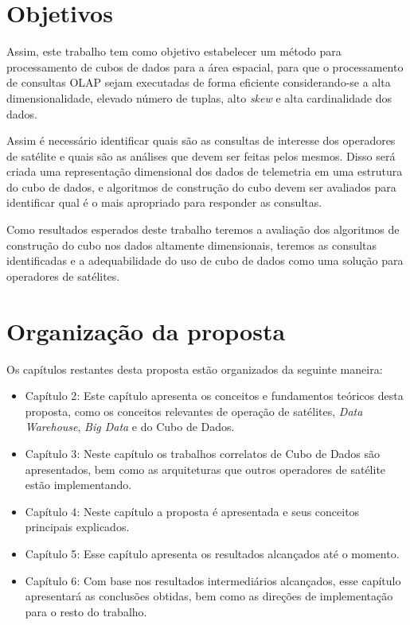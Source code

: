 \section{Objetivos}\label{ch:intro:obj}

{\color{cerulean}

Assim, este trabalho tem como objetivo estabelecer um método para processamento de cubos de dados para a área espacial, para que o processamento de consultas OLAP sejam executadas de forma eficiente considerando-se a alta dimensionalidade, elevado número de tuplas, alto \textit{skew} e alta cardinalidade dos dados.

Assim é necessário identificar quais são as consultas de interesse dos operadores de satélite e quais são as análises que devem ser feitas pelos mesmos.
Disso será criada uma representação dimensional dos dados de telemetria em uma estrutura do cubo de dados, e  algoritmos de construção do cubo devem ser avaliados para identificar qual é o mais apropriado para responder as consultas.

Como resultados esperados deste trabalho teremos a avaliação dos algoritmos de construção do cubo nos dados altamente dimensionais, teremos as consultas identificadas e a adequabilidade do uso de cubo de dados como uma solução para operadores de satélites.

}

\section{Organização da proposta}\label{ch:intro:org}

Os capítulos restantes desta proposta estão organizados da seguinte maneira:

\begin{itemize}
	\item{Capítulo 2}: Este capítulo apresenta os conceitos e fundamentos teóricos desta proposta, como os conceitos relevantes de operação de satélites, \textit{Data Warehouse}, \textit{Big Data} e do Cubo de Dados.
	\item{Capítulo 3}: Neste capítulo os trabalhos correlatos de Cubo de Dados são apresentados, bem como as arquiteturas que outros operadores de satélite estão implementando.
	\item{Capítulo 4}: Neste capítulo a proposta é apresentada e seus conceitos principais explicados.
	\item{Capítulo 5}: Esse capítulo apresenta os resultados alcançados até o momento.
	\item{Capítulo 6}: Com base nos resultados intermediários alcançados, esse capítulo apresentará as conclusões obtidas, bem como as direções de implementação para o resto do trabalho.
\end{itemize}

